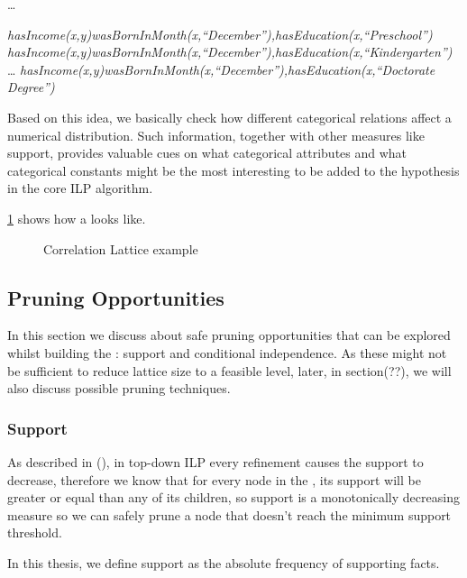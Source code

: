   \dots \newline

  \emph{hasIncome(x,y)wasBornInMonth(x,``December''),hasEducation(x,``Preschool'')} \newline
  \emph{hasIncome(x,y)wasBornInMonth(x,``December''),hasEducation(x,``Kindergarten'')} \newline
  \dots \newline
  \emph{hasIncome(x,y)wasBornInMonth(x,``December''),hasEducation(x,``Doctorate Degree'')} \newline


Based on this idea, we basically check how different categorical relations affect a numerical distribution. Such
information, together with other measures like support, provides valuable cues on what categorical attributes and what
categorical constants might be the most interesting to be added to the hypothesis in the core ILP algorithm.

\ref{fig:lattice} shows how a \graphname looks like.

\begin{figure}[!h]
  \caption{Correlation Lattice example}
  \centering
  
  \label{fig:lattice}
\end{figure}

\subsection{Pruning Opportunities}

In this section we discuss about safe pruning opportunities that can be explored whilst building the \graphname: support
and conditional independence. As these might not be sufficient to reduce lattice size to a feasible level, later, in
section(??), we will also discuss possible pruning techniques.

\subsubsection{Support}

As described in (\cite{LavracDz94}), in top-down ILP every refinement causes the support to decrease, therefore we know
that for every node in the \graphname, its support will be greater or equal than any of its children, so support is a
monotonically decreasing measure so we can safely prune a node that doesn't reach the minimum support threshold.

In this thesis, we define support as the absolute frequency of supporting facts.


